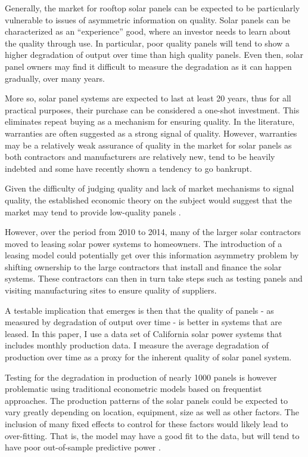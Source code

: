 \documentclass[12pt]{article}
\begin{document}
Generally, the market for rooftop solar panels can be expected to be particularly vulnerable to issues of asymmetric information on quality. Solar panels can be characterized as an ``experience'' good, where an investor needs to learn about the quality through use. In particular, poor quality panels will tend to show a higher degradation of output over time than high quality panels. Even then, solar panel owners may find it difficult to measure the degradation as it can happen gradually, over many years. 

More so, solar panel systems are expected to last at least 20 years, thus for all practical purposes, their purchase can be considered a one-shot investment. This eliminates repeat buying as a mechanism for ensuring quality. In the literature, warranties are often suggested as a strong signal of quality. However, warranties may be a relatively weak assurance of quality in the market for solar panels as both contractors and manufacturers are relatively new, tend to be heavily indebted and some have recently shown a tendency to go bankrupt. 

Given the difficulty of judging quality and lack of market mechanisms to signal quality, the established economic theory on the subject would suggest that the market may tend to provide low-quality panels \citet{tirole_theory_1988}.

However, over the period from 2010 to 2014, many of the larger solar contractors moved to leasing solar power systems to homeowners. The introduction of a leasing model could potentially get over this information asymmetry problem by shifting ownership to the large contractors that install and finance the solar systems. These contractors can then in turn take steps such as testing panels and visiting manufacturing sites to ensure quality of suppliers. 

A testable implication that emerges is then that the quality of panels - as measured by degradation of output over time - is better in systems that are leased.  In this paper, I use a data set of California solar power systems that includes monthly production data. I measure the average degradation of production over time as a proxy for the inherent quality of solar panel system. 

Testing for the degradation in production of nearly 1000 panels is however problematic using traditional econometric models based on frequentist approaches. The production patterns of the solar panels could be expected to vary greatly depending on location, equipment, size as well as other factors. The inclusion of many fixed effects to control for these factors would likely lead to over-fitting. That is, the model may have a good fit to the data, but will tend to have poor out-of-sample predictive power \citep{gelman_bayesian_2013}. 
\end{document}
